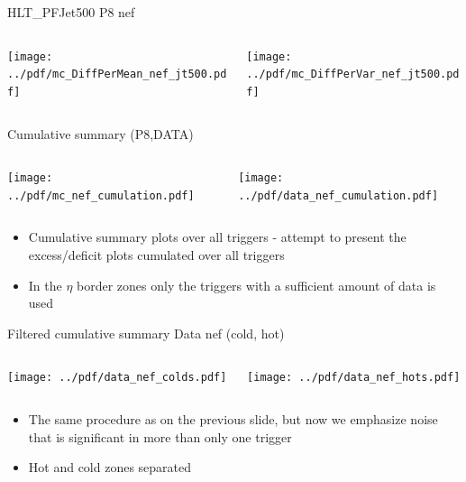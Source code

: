 \documentclass[9pt]{beamer}
\begin{document}
\begin{frame}[t]{HLT\_PFJet500 P8 nef}
\begin{columns}[T]
  \begin{column}{.5\textwidth}
  \texttt{[image: ../pdf/mc\_DiffPerMean\_nef\_jt500.pdf]}
  \end{column}
  \begin{column}{.5\textwidth}
  \texttt{[image: ../pdf/mc\_DiffPerVar\_nef\_jt500.pdf]}
  \end{column}
\end{columns}
\end{frame}

\begin{frame}[t]{Cumulative summary (P8,DATA)}
\begin{columns}[T]
  \begin{column}{.5\textwidth}
  \texttt{[image: ../pdf/mc\_nef\_cumulation.pdf]}
  \end{column}
  \begin{column}{.5\textwidth}
  \texttt{[image: ../pdf/data\_nef\_cumulation.pdf]}
  \end{column}
\end{columns}
\begin{itemize}
 \item Cumulative summary plots over all triggers - attempt to present the excess/deficit plots cumulated over all triggers
 \item In the $\eta$ border zones only the triggers with a sufficient amount of data is used
\end{itemize}
\end{frame}

\begin{frame}[t]{Filtered cumulative summary Data nef (cold, hot)}
\begin{columns}[T]
  \begin{column}{.5\textwidth}
  \texttt{[image: ../pdf/data\_nef\_colds.pdf]}
  \end{column}
  \begin{column}{.5\textwidth}
  \texttt{[image: ../pdf/data\_nef\_hots.pdf]}
  \end{column}
\end{columns}
\begin{itemize}
 \item The same procedure as on the previous slide, but now we emphasize noise that is significant in more than only one trigger
 \item Hot and cold zones separated
\end{itemize}
\end{frame}
\end{document}
